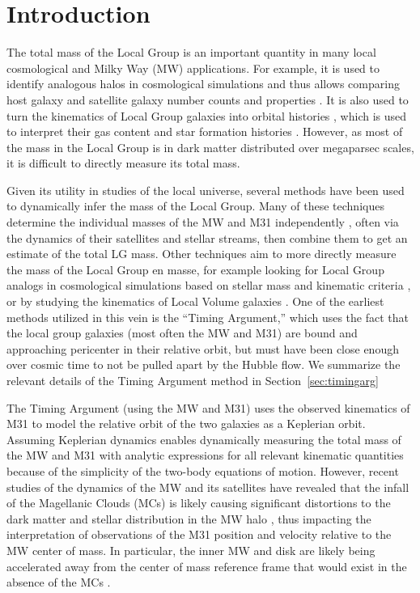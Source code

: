 \documentclass[twocolumn]{aastex631}
\begin{document}
\section{Introduction}
\label{sec:intro}
The total mass of the Local Group is an important quantity in many local
cosmological and Milky Way (MW) applications.
For example, it is used to identify analogous halos in cosmological simulations
and thus allows comparing host galaxy and satellite galaxy number counts and
properties \citep[e.g.,][]{Patel2017a, Marinacci:2017, Dooley2017, Besla2018,
Patel2018, Sawala2022}. It is also used to turn the kinematics of Local Group
galaxies into orbital histories \citep[e.g.,][]{Peebles:2017}, which is used to
interpret their gas content \citep[e.g.,][]{Fillingham:2018,Putman:2021} and
star formation histories \citep[e.g.,][]{Tolstoy:2009}.
However, as most of the mass in the Local Group is in dark matter distributed
over megaparsec scales, it is difficult to directly measure its total mass.

Given its utility in studies of the local universe, several methods have been
used to dynamically infer the mass of the Local Group.
Many of these techniques determine the individual masses of the MW and M31
independently \citep[e.g.][]{Watkins2010, Diaz2014, Patel2018, Eadie:2019,
Fritz:2020, Deason:2021, Wang:2022}, often via the dynamics of their satellites
and stellar streams, then combine them to get an estimate of the total LG mass.
Other techniques aim to more directly measure the mass of the Local Group en
masse, for example looking for Local Group analogs in cosmological simulations
based on stellar mass and kinematic criteria \citep[e.g.,][]{Zhai2020}, or by
studying the kinematics of Local Volume galaxies
\citep[e.g.,][]{Penarrubia2014}.
One of the earliest methods utilized in this vein is the ``Timing Argument,''
which uses the fact that the local group galaxies (most often the MW and M31)
are bound and approaching pericenter in their relative orbit, but must have been
close enough over cosmic time to not be pulled apart by the Hubble flow. We
summarize the relevant details of the Timing Argument method in
Section~\ref{sec:timingarg}

The Timing Argument (using the MW and M31) uses the observed kinematics of M31
to model the relative orbit of the two galaxies as a Keplerian orbit.
Assuming Keplerian dynamics enables dynamically measuring the total mass of the
MW and M31 with analytic expressions for all relevant kinematic quantities
because of the simplicity of the two-body equations of motion.
However, recent studies of the dynamics of the MW and its satellites have
revealed that the infall of the Magellanic Clouds (MCs) is likely causing
significant distortions to the dark matter and stellar distribution in the MW
halo \citep{Laporte:2018a, Laporte:2018b, Garavito-Camargo:2019, Conroy:2021},
thus impacting the interpretation of observations of the M31 position and
velocity relative to the MW center of mass.
In particular, the inner MW and disk are likely being accelerated away from the
center of mass reference frame that would exist in the absence of the MCs
\citep{Gomez2015, Garavito-Camargo2021b}.
\end{document}
